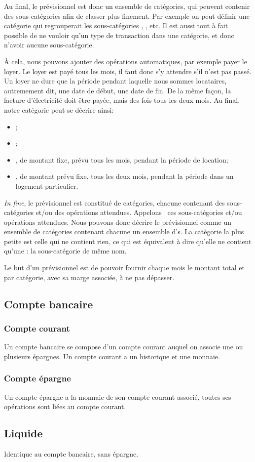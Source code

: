 Au final, le prévisionnel est donc un ensemble de catégories, qui
peuvent contenir des sous-catégories afin de classer plus finement. Par
exemple on peut définir une catégorie 
qui regrouperait les sous-catégories ,
, etc. Il est aussi tout à fait possible
de ne vouloir qu'un type de transaction dans une catégorie, et
donc n'avoir aucune sous-catégorie.

\`A cela, nous pouvons ajouter des opérations automatiques, par
exemple payer le loyer. Le loyer est payé tous les mois, il faut
donc s'y attendre s'il n'est pas passé. Un loyer ne dure que la période
pendant laquelle nous sommes locataires, autremement dit, une date de
début, une date de fin. De la même façon, la facture d'électricité doit
être payée, mais des fois tous les deux mois. Au final, notre catégorie
 peut se décrire ainsi:
\begin{itemize}
\item {};
\item {};
\item {}, de montant fixe, prévu tous les mois, pendant la période
                           de location;
\item {}, de montant prévu fixe, tous les deux mois,
                                    pendant la période dans un logement particulier.
\end{itemize}

\textit{In fine}, le prévisionnel est constitué de catégories, chacune contenant des sous-catégories
et/ou des opérations attendues. Appelons \operation\ ces sous-catégories et/ou
opérations attendues. Nous pouvons donc décrire le prévisionnel comme un 
ensemble de catégories contenant chacune un ensemble d'\operation s.
La catégorie la plus petite est celle qui ne contient rien, ce qui
est équivalent à dire qu'elle ne contient qu'une \operation: la
sous-catégorie de même nom.

Le but d'un prévisionnel est de pouvoir fournir chaque mois le montant total
et par catégorie, avec sa marge associée, à ne pas dépasser.

\subsection{Compte bancaire}
\subsubsection{Compte courant}
Un compte bancaire se compose d'un compte courant auquel
on associe une ou plusieurs épargnes. Un compte courant
a un historique et une monnaie.
\subsubsection{Compte épargne}
Un compte épargne a la monnaie de son compte courant associé, toutes
ses opérations sont liées au compte courant.
\subsection{Liquide}
Identique au compte bancaire, sans épargne.
